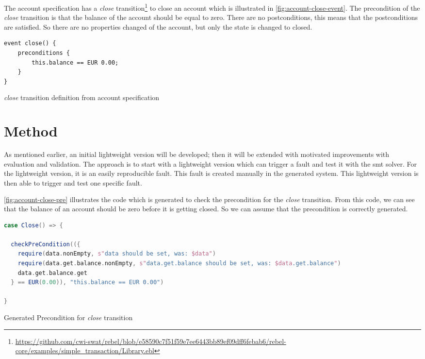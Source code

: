 The account specification has a \textit{close} transition\footnote{\url{https://github.com/cwi-swat/rebel/blob/e58590c7f51f59e7ee6443bb89ef09dff6febab6/rebel-core/examples/simple_transaction/Library.ebl}}
to close an account which is illustrated in \autoref{fig:account-close-event}.
The precondition of the \textit{close} transition is that the balance of the account should be
equal to zero. There are no postconditions, this means that the postconditions
are satisfied. So there are no properties changed of the account, but only the state
is changed to closed.

\begin{sourcecode}[h!]
\begin{lstlisting}[]
event close() {
	preconditions {
		this.balance == EUR 0.00;
	}
}
\end{lstlisting}
\caption{\textit{close} transition definition from account specification}\label{fig:account-close-event}
\end{sourcecode}
\FloatBarrier

\section{Method}\label{sec:ch3-method}

As mentioned earlier, an initial lightweight version will be developed; then it will
be extended with motivated improvements with evaluation and validation. The
approach is to start with a lightweight version which can trigger a fault
and test it with the \gls{smt} solver. For the lightweight version, it is an easily
reproducible fault. This fault is created manually in the generated system.
This lightweight version is then able to trigger and test one specific fault.

\autoref{fig:account-close-pre} illustrates the code which is generated to check
the precondition for the \textit{close} transition. From this code, we can see that the
balance of an account should be zero before it is getting closed. So we can
assume that the precondition is correctly generated.

\begin{sourcecode}[h!]
\begin{lstlisting}[language=scala]
case Close() => {

  checkPreCondition(({
    require(data.nonEmpty, s"data should be set, was: $data")
    require(data.get.balance.nonEmpty, s"data.get.balance should be set, was: $data.get.balance")
    data.get.balance.get
  } == EUR(0.00)), "this.balance == EUR 0.00")

}
\end{lstlisting}
\caption{Generated Precondition for \textit{close} transition}\label{fig:account-close-pre}
\end{sourcecode}
\FloatBarrier

